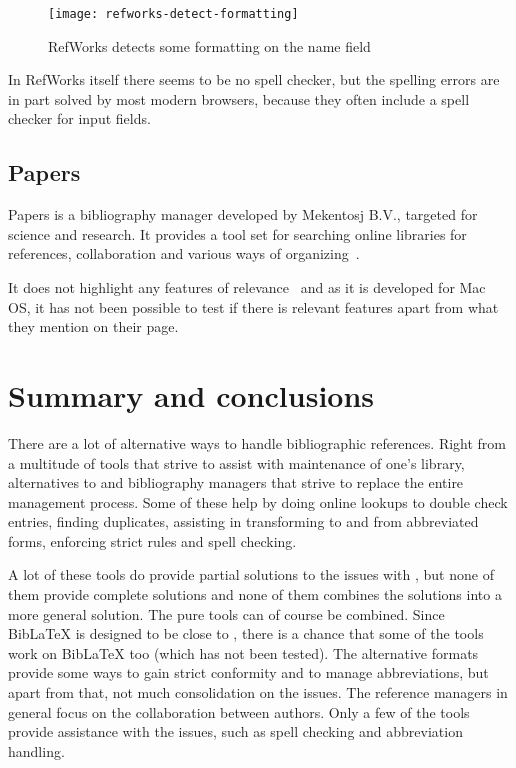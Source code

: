 \begin{figure}
    \centering
    \texttt{[image: refworks-detect-formatting]}
    \caption{RefWorks detects some formatting on the name field}
    \label{fig:refworks-detect-formatting}
\end{figure}

In RefWorks itself there seems to be no spell checker, but the
spelling errors are in part solved by most modern browsers, because
they often include a spell checker for input fields.

\subsection{Papers}
Papers is a bibliography manager developed by Mekentosj B.V., targeted
for science and research.  It provides a tool set for searching online
libraries for references, collaboration and various ways of
organizing~\cite{papers_features}.

It does not highlight any features of relevance~\cite{papers_features}
and as it is developed for Mac OS, it has not been possible to test if
there is relevant features apart from what they mention on their page.




\section{Summary and conclusions}
There are a lot of alternative ways to handle
bibliographic references.  Right from a multitude of tools that strive
to assist with maintenance of one's {\bibtex} library, alternatives to
{\bibtex} and bibliography managers that strive to replace the entire
management process.  Some of these help by doing online lookups to
double check entries, finding duplicates, assisting in transforming to
and from abbreviated forms, enforcing strict rules and spell checking.

A lot of these tools do provide partial solutions to the issues with
{\bibtex}, but none of them provide complete solutions and none of
them combines the solutions into a more general solution.  The pure
{\bibtex} tools can of course be combined.  Since Bib{\LaTeX} is
designed to be close to {\bibtex}, there is a chance that some of the
{\bibtex} tools work on Bib{\LaTeX} too (which has not been tested).
The alternative formats provide some ways to gain strict conformity
and to manage abbreviations, but apart from that, not much
consolidation on the issues.  The reference managers in general focus
on the collaboration between authors.  Only a few of the tools provide
assistance with the issues, such as spell checking and abbreviation
handling.


